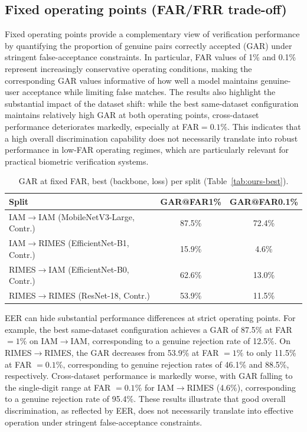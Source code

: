 \subsection{Fixed operating points (FAR/FRR trade-off)}
\label{sec:operating-points}

Fixed operating points provide a complementary view of verification performance by quantifying the proportion of genuine pairs correctly accepted (GAR) under stringent false-acceptance constraints. In particular, FAR values of 1\% and 0.1\% represent increasingly conservative operating conditions, making the corresponding GAR values informative of how well a model maintains genuine-user acceptance while limiting false matches. The results also highlight the substantial impact of the dataset shift: while the best same-dataset configuration maintains relatively high GAR at both operating points, cross-dataset performance deteriorates markedly, especially at FAR$=0.1\%$. This indicates that a high overall discrimination capability does not necessarily translate into robust performance in low-FAR operating regimes, which are particularly relevant for practical biometric verification systems.

\begin{table}[htbp]
  \centering
  \caption{GAR at fixed FAR, best (backbone, loss) per split
  (Table~\ref{tab:ours-best}).}
  \label{tab:operating-points}
  \small
  \begin{tabular}{lcc}
    \toprule
    Split & GAR@FAR1\% & GAR@FAR0.1\% \\
    \midrule
    IAM$\to$IAM (MobileNetV3-Large, Contr.)     & 87.5\% & 72.4\% \\
    IAM$\to$RIMES (EfficientNet-B1, Contr.)     & 15.9\% & 4.6\%  \\
    RIMES$\to$IAM (EfficientNet-B0, Contr.)     & 62.6\% & 13.0\% \\
    RIMES$\to$RIMES (ResNet-18, Contr.)         & 53.9\% & 11.5\% \\
    \bottomrule
  \end{tabular}
\end{table}

EER can hide substantial performance differences at strict operating points. For example, the best same-dataset configuration achieves a GAR of 87.5\% at FAR $=1\%$ on IAM$\to$IAM, corresponding to a genuine rejection rate of 12.5\%. On RIMES$\to$RIMES, the GAR decreases from 53.9\% at FAR $=1\%$ to only 11.5\% at FAR $=0.1\%$, corresponding to genuine rejection rates of 46.1\% and 88.5\%, respectively. Cross-dataset performance is markedly worse, with GAR falling to the single-digit range at FAR $=0.1\%$ for IAM$\to$RIMES (4.6\%), corresponding to a genuine rejection rate of 95.4\%. These results illustrate that good overall discrimination, as reflected by EER, does not necessarily translate into effective operation under stringent false-acceptance constraints.

